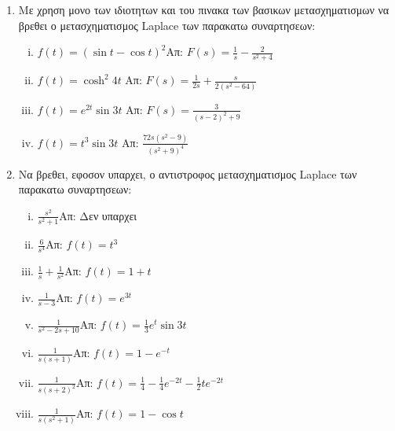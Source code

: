 



\everymath{\displaystyle}



\begin{center}
\end{center}

\vspace{\baselineskip}

\begin{enumerate}

\item Με χρηση μονο των ιδιοτητων και του πινακα των βασικων μετασχηματισμων να βρεθει ο μετασχηματισμος \textlatin{Laplace} των παρακατω συναρτησεων:

\begin{enumerate}[i)]

\item $f(t)=(\sin t-\cos t)^2$\hfill Απ: $F(s)=\frac{1}{s}-\frac{2}{s^2+4}$

\item $f(t)=\cosh^2 4t$ \hfill Απ: $F(s)=\frac{1}{2s}+\frac{s}{2(s^2-64)}$

\item $f(t)=e^{2t}\sin 3t$ \hfill Απ: $F(s)=\frac{3}{(s-2)^2+9}$


\item $f(t)=t^3\sin 3t$ \hfill Απ: $\frac{72s(s^2-9)}{(s^2+9)^4}$

\end{enumerate}

\item Να βρεθει, εφοσον υπαρχει, ο αντιστροφος μετασχηματισμος \textlatin{Laplace} των παρακατω συναρτησεων:

\begin{enumerate}[i)]

\item $\frac{s^2}{s^2+1}$\hfill Απ: Δεν υπαρχει
\item $\frac{6}{s^4}$\hfill Απ: $f(t)=t^3$
\item $\frac{1}{s}+\frac{1}{s^2}$\hfill Απ: $f(t)=1+t$
\item $\frac{1}{s-3}$\hfill Απ: $f(t)=e^{3t}$
\item $\frac{1}{s^2-2s+10}$\hfill Απ: $f(t)=\frac{1}{3}e^t\sin 3t$
\item $\frac{1}{s(s+1)}$\hfill Απ: $f(t)=1-e^{-t}$
\item $\frac{1}{s(s+2)^2}$\hfill Απ: $f(t)=\frac{1}{4}-\frac{1}{4}e^{-2t}-\frac{1}{2}te^{-2t}$
\item $\frac{1}{s(s^2+1)}$\hfill Απ: $f(t)=1-\cos t$


\end{enumerate}
\end{enumerate}
